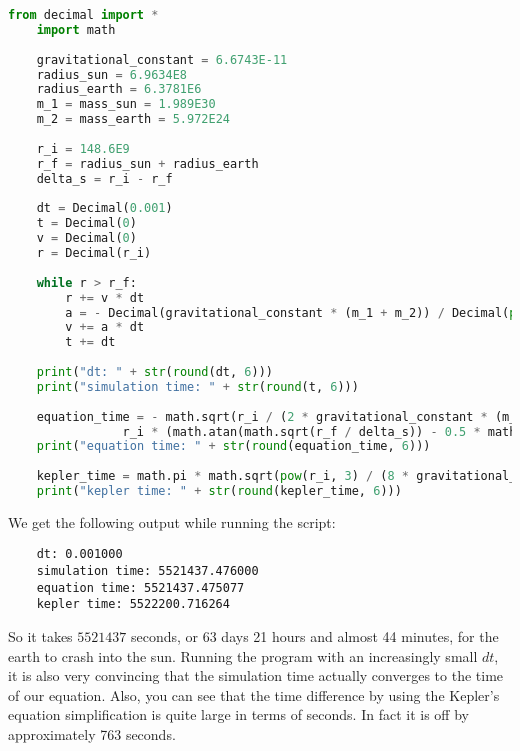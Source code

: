 \documentclass{article}
\begin{document}
\begin{lstlisting}[language=Python]
    from decimal import *
    import math
    
    gravitational_constant = 6.6743E-11
    radius_sun = 6.9634E8
    radius_earth = 6.3781E6
    m_1 = mass_sun = 1.989E30
    m_2 = mass_earth = 5.972E24
    
    r_i = 148.6E9
    r_f = radius_sun + radius_earth
    delta_s = r_i - r_f
    
    dt = Decimal(0.001)
    t = Decimal(0)
    v = Decimal(0)
    r = Decimal(r_i)
    
    while r > r_f:
        r += v * dt
        a = - Decimal(gravitational_constant * (m_1 + m_2)) / Decimal(pow(r, 2))
        v += a * dt
        t += dt
    
    print("dt: " + str(round(dt, 6)))
    print("simulation time: " + str(round(t, 6)))
    
    equation_time = - math.sqrt(r_i / (2 * gravitational_constant * (m_1 + m_2))) * (
                r_i * (math.atan(math.sqrt(r_f / delta_s)) - 0.5 * math.pi) - math.sqrt(r_f * delta_s))
    print("equation time: " + str(round(equation_time, 6)))
    
    kepler_time = math.pi * math.sqrt(pow(r_i, 3) / (8 * gravitational_constant * (m_1 + m_2)))
    print("kepler time: " + str(round(kepler_time, 6)))    
\end{lstlisting}
We get the following output while running the script:
\begin{lstlisting}
    dt: 0.001000
    simulation time: 5521437.476000
    equation time: 5521437.475077
    kepler time: 5522200.716264
\end{lstlisting}
So it takes $5521437$ seconds, or 63 days 21 hours and almost 44 minutes, for the earth to crash into the sun. Running the program with an increasingly small $dt$, it is also very convincing that the simulation time actually converges to the time of our equation. Also, you can see that the time difference by using the Kepler's equation simplification is quite large in terms of seconds. In fact it is off by approximately 763 seconds. 
\end{document}
